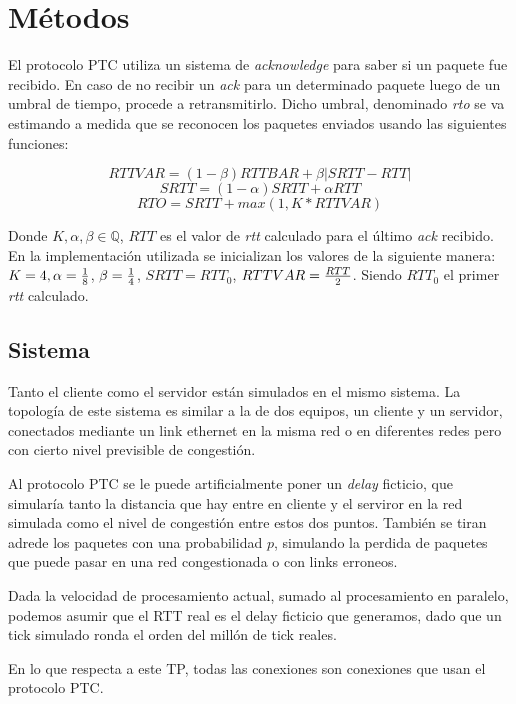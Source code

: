 \section{M\'etodos}
    
    El protocolo PTC utiliza un sistema de \textit{acknowledge} para
    saber si un paquete fue recibido. En caso de no recibir un \textit{ack}
    para un  determinado paquete luego de un umbral de tiempo, procede a
    retransmitirlo. Dicho umbral, denominado \textit{rto} se va estimando
    a medida que se reconocen los paquetes enviados usando las 
    siguientes funciones: 
    
        $$RTTVAR = (1-\beta)RTTBAR + \beta |SRTT-RTT|$$
        $$SRTT = (1-\alpha)SRTT + \alpha RTT$$
        $$RTO = SRTT + max( 1, K * RTTVAR) $$ 
        
    Donde $K, \alpha, \beta \in \mathbb{Q}$, $RTT$ es el valor de 
    \textit{rtt} calculado para el \'ultimo \textit{ack} recibido. 
    En la implementaci\'on utilizada se inicializan los valores de la
    siguiente manera: $K = 4, \alpha={{1}\over{8}}$,
    $\beta={{1}\over{4}}$, $SRTT={RTT_0}$, $RTTVAR={{RTT}\over{2}}$.
    Siendo $RTT_0$ el primer \textit{rtt} calculado.
    
\subsection{Sistema}

	Tanto el cliente como el servidor est\'an simulados en el mismo sistema. La
	topolog\'ia de este sistema es similar a la de dos equipos, un cliente y un
	servidor, conectados mediante un link ethernet en la misma red o en
	diferentes redes pero con cierto nivel previsible de congesti\'on.

	Al protocolo PTC se le puede artificialmente poner un \emph{delay} ficticio,
	que simular\'ia tanto la distancia que hay entre en cliente y el serviror en
	la red simulada como el nivel de congesti\'on entre estos dos puntos.
	Tambi\'en se tiran adrede los paquetes con una probabilidad $p$, simulando
	la perdida de paquetes que puede pasar en una red congestionada o con links
	erroneos.

	Dada la velocidad de procesamiento actual, sumado al procesamiento en
	paralelo, podemos asumir que el RTT real es el delay ficticio que generamos,
	dado que un tick simulado ronda el orden del mill\'on de tick reales.

	En lo que respecta a este TP, todas las conexiones son conexiones que usan
	el protocolo PTC.
